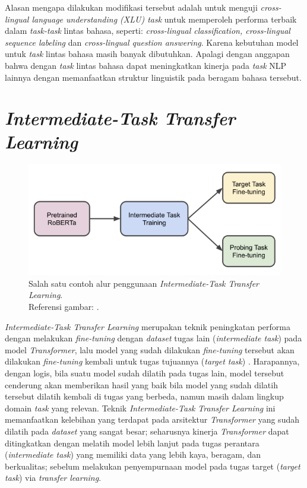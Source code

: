 Alasan mengapa dilakukan modifikasi tersebut adalah untuk menguji \emph{cross-lingual language understanding (XLU) task} untuk  memperoleh performa terbaik dalam \emph{task-task} lintas bahasa, seperti: \emph{cross-lingual classification, cross-lingual sequence labeling} dan \emph{cross-lingual question answering}. Karena kebutuhan model untuk \emph{task} lintas bahasa masih banyak dibutuhkan. Apalagi dengan anggapan bahwa dengan \emph{task} lintas bahasa dapat meningkatkan kinerja pada \emph{task} NLP lainnya dengan memanfaatkan struktur linguistik pada beragam bahasa tersebut.

\section{\emph{Intermediate-Task Transfer Learning}}
\label{2.6}

\begin{figure}[h]
\includegraphics[width=\linewidth]{assets/pics/ittl-pipeline.png}
\centering
\caption{Salah satu contoh alur penggunaan \emph{Intermediate-Task Transfer Learning}.\\\hspace{\textwidth}Referensi gambar: \citep{pruksachatkun-etal-2020-intermediate}.}
\end{figure}

\emph{Intermediate-Task Transfer Learning} merupakan teknik peningkatan performa dengan melakukan \emph{fine-tuning} dengan \emph{dataset} tugas lain (\emph{intermediate task}) pada model \emph{Transformer}, lalu model yang sudah dilakukan \emph{fine-tuning} tersebut akan dilakukan \emph{fine-tuning} kembali untuk tugas tujuannya (\emph{target task}) \citep{pruksachatkun-etal-2020-intermediate}. Harapannya, dengan logis, bila suatu model sudah dilatih pada tugas lain, model tersebut cenderung akan memberikan hasil yang baik bila model yang sudah dilatih tersebut dilatih kembali di tugas yang berbeda, namun masih dalam lingkup domain \emph{task} yang relevan. Teknik \emph{Intermediate-Task Transfer Learning} ini memanfaatkan kelebihan yang terdapat pada arsitektur \emph{Transformer} yang sudah dilatih pada \emph{dataset} yang sangat besar; seharusnya kinerja \emph{Transformer} dapat ditingkatkan dengan melatih model lebih lanjut pada tugas perantara (\emph{intermediate task}) yang memiliki data yang lebih kaya, beragam, dan berkualitas; sebelum melakukan penyempurnaan model pada tugas target (\emph{target task}) via \emph{transfer learning}. 

